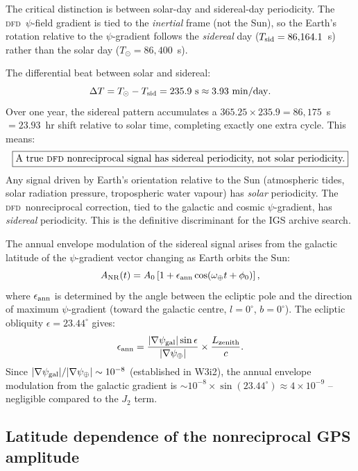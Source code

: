 \documentclass[aps,prd,twocolumn,superscriptaddress,nofootinbib,longbibliography]{revtex4-2}
\newcommand{\DFD}{\textsc{dfd}}
\begin{document}
The critical distinction is between solar-day and sidereal-day periodicity.
The \DFD\ $\psi$-field gradient is tied to the \emph{inertial} frame
(not the Sun), so the Earth's rotation relative to the $\psi$-gradient
follows the \emph{sidereal} day ($T_{\rm sid} = 86{,}164.1$~s) rather
than the solar day ($T_\odot = 86{,}400$~s).

The differential beat between solar and sidereal:
\begin{equation}
\Delta T = T_\odot - T_{\rm sid} = 235.9\ \si{s} \approx 3.93\ \si{min/day}.
\end{equation}
Over one year, the sidereal pattern accumulates a $365.25\times235.9
= 86{,}175$~s $= 23.93$~hr shift relative to solar time, completing
exactly one extra cycle.  This means:
\begin{equation}
\boxed{
\text{A true \DFD\ nonreciprocal signal has sidereal periodicity,
not solar periodicity.}
}
\end{equation}
Any signal driven by Earth's orientation relative to the Sun (atmospheric
tides, solar radiation pressure, tropospheric water vapour) has \emph{solar}
periodicity.  The \DFD\ nonreciprocal correction, tied to the galactic and
cosmic $\psi$-gradient, has \emph{sidereal} periodicity.  This is the
definitive discriminant for the IGS archive search.

The annual envelope modulation of the sidereal signal arises from the
galactic latitude of the $\psi$-gradient vector changing as Earth orbits the
Sun:
\begin{equation}
A_{\rm NR}(t) = A_0\left[1 + \epsilon_{\rm ann}\cos\!\left(\omega_\oplus t
+ \phi_0\right)\right],
\end{equation}
where $\epsilon_{\rm ann}$ is determined by the angle between the ecliptic
pole and the direction of maximum $\psi$-gradient (toward the galactic centre,
$l = 0^\circ$, $b = 0^\circ$).  The ecliptic obliquity $\epsilon = 23.44^\circ$
gives:
\begin{equation}
\epsilon_{\rm ann} = \frac{|\nabla\psi_{\rm gal}|\sin\epsilon}{|\nabla\psi_\oplus|}
\times\frac{L_{\rm zenith}}{c}.
\end{equation}
Since $|\nabla\psi_{\rm gal}|/|\nabla\psi_\oplus|\sim10^{-8}$ (established
in W3i2), the annual envelope modulation from the galactic gradient is
$\sim10^{-8}\times\sin(23.44^\circ)\approx 4\times10^{-9}$ -- negligible
compared to the $J_2$ term.

\subsection{Latitude dependence of the nonreciprocal GPS amplitude}
\end{document}
